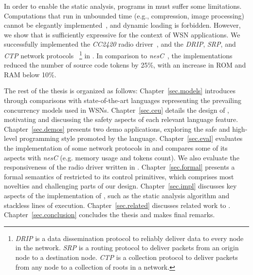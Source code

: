 In order to enable the static analysis, programs in \CEU must suffer some 
limitations.
Computations that run in unbounded time (e.g., compression, image processing) 
cannot be elegantly implemented~\cite{rp.hypothesis}, and dynamic loading is 
forbidden.
%
%
However, we show that \CEU is sufficiently expressive for the context of WSN 
applications.
We successfully implemented the \emph{CC2420} radio driver~\cite{wsn.teps}, and 
the \emph{DRIP}, \emph{SRP}, and \emph{CTP} network protocols~\cite{wsn.teps}%
\footnote{
\emph{DRIP} is a data dissemination protocol to reliably deliver data to every 
node in the network.
\emph{SRP} is a routing protocol to deliver packets from an origin node to a 
destination node.
\emph{CTP} is a collection protocol to deliver packets from any node to a 
collection of roots in a network.
}
in \CEU.
In comparison to \emph{nesC}~\cite{wsn.nesc}, the implementations reduced the 
number of source code tokens by 25\%, with an increase in ROM and RAM below 
10\%.


The rest of the thesis is organized as follows:
%
Chapter~\ref{sec.models} introduces \CEU through comparisons with 
state-of-the-art languages representing the prevailing concurrency models used 
in WSNs.
%
Chapter~\ref{sec.ceu} details the design of \CEU, motivating and discussing the
safety aspects of each relevant language feature.
%
Chapter~\ref{sec.demos} presents two demo applications, exploring the safe and 
high-level programming style promoted by the language.
%
Chapter~\ref{sec.eval} evaluates the implementation of some network protocols 
in \CEU and compares some of its aspects with \emph{nesC} (e.g. memory usage 
and tokens count).
We also evaluate the responsiveness of the radio driver written in \CEU.
%
Chapter~\ref{sec.formal} presents a formal semantics of \CEU restricted to its 
control primitives, which comprises most novelties and challenging parts of our 
design.
%
Chapter~\ref{sec.impl} discusses key aspects of the implementation of \CEU, 
such as the static analysis algorithm and stackless lines of execution.
%
Chapter~\ref{sec.related} discusses related work to \CEU.
%
Chapter~\ref{sec.conclusion} concludes the thesis and makes final remarks.
